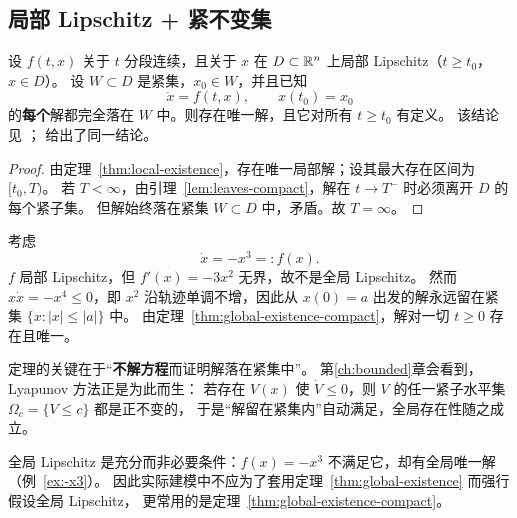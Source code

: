 \subsection{局部 Lipschitz + 紧不变集}

\begin{theorem}\label{thm:global-existence-compact}
  设 $f(t,x)$ 关于 $t$ 分段连续，且关于 $x$ 在 $D\subset\mathbb{R}^n$ 上局部 Lipschitz（$t\ge t_0$，$x\in D$）。
  设 $W\subset D$ 是紧集，$x_0\in W$，并且已知
  \[
    \dot x=f(t,x),\qquad x(t_0)=x_0
  \]
  的\textbf{每个}解都完全落在 $W$ 中。则存在唯一解，且它对所有 $t\ge t_0$ 有定义。
  该结论见 \cite[Theorem 3.3]{khalilNonlinearSystems}；\cite[Lemma 1.3]{khalilNonlinearControl2015} 给出了同一结论。
\end{theorem}

\begin{proof}
  由定理~\ref{thm:local-existence}，存在唯一局部解；设其最大存在区间为 $[t_0,T)$。
  若 $T<\infty$，由引理~\ref{lem:leaves-compact}，解在 $t\to T^-$ 时必须离开 $D$ 的每个紧子集。
  但解始终落在紧集 $W\subset D$ 中，矛盾。故 $T=\infty$。
\end{proof}

\begin{example}\label{ex:-x3}
  考虑
  \begin{equation}
    \dot x=-x^3=:f(x).
  \end{equation}
  $f$ 局部 Lipschitz，但 $f'(x)=-3x^2$ 无界，故不是全局 Lipschitz。
  然而 $x\dot x=-x^4\le0$，即 $x^2$ 沿轨迹单调不增，因此从 $x(0)=a$ 出发的解永远留在紧集 $\{x:|x|\le|a|\}$ 中。
  由定理~\ref{thm:global-existence-compact}，解对一切 $t\ge0$ 存在且唯一。
  \cite[Example 3.5/3.6]{khalilNonlinearSystems}
\end{example}

\begin{remark}
  定理的关键在于“\textbf{不解方程}而证明解落在紧集中”。
  第\ref{ch:bounded}章会看到，Lyapunov 方法正是为此而生：
  若存在 $V(x)$ 使 $\dot V\le0$，则 $V$ 的任一紧子水平集 $\Omega_c=\{V\le c\}$ 都是正不变的，
  于是“解留在紧集内”自动满足，全局存在性随之成立。
\end{remark}

\begin{remark}[保守性]
  全局 Lipschitz 是充分而非必要条件：$f(x)=-x^3$ 不满足它，却有全局唯一解（例~\ref{ex:-x3}）。
  因此实际建模中不应为了套用定理~\ref{thm:global-existence} 而强行假设全局 Lipschitz，
  更常用的是定理~\ref{thm:global-existence-compact}。
\end{remark}

